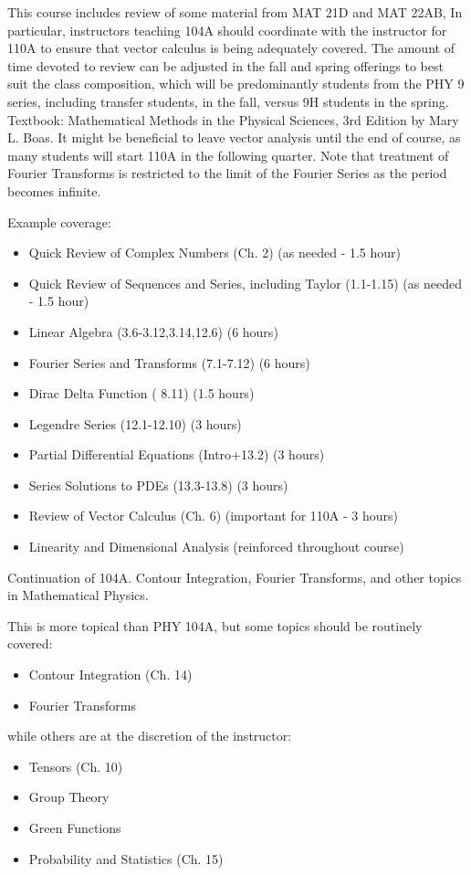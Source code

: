 \documentclass[12pt]{article}
\begin{document}
This course includes review of some material from MAT 21D and MAT
22AB, In particular, instructors teaching 104A should coordinate with
the instructor for 110A to ensure that vector calculus is being
adequately covered.  The amount of time devoted to review can be
adjusted in the fall and spring offerings to best suit the class
composition, which will be predominantly students from the PHY 9
series, including transfer students, in the fall, versus 9H students
in the spring.  Textbook: Mathematical Methods in the Physical
Sciences, 3rd Edition by Mary L. Boas.  It might be beneficial to
leave vector analysis until the end of course, as many students will
start 110A in the following quarter.  Note that treatment of Fourier
Transforms is restricted to the limit of the Fourier Series as the
period becomes infinite.

\begin{samepage}
Example coverage:
\begin{itemize}
\item Quick Review of Complex Numbers (Ch. 2) (as needed - 1.5 hour)
\item Quick Review of Sequences and Series, including Taylor (1.1-1.15) (as needed - 1.5 hour)
\item Linear Algebra (3.6-3.12,3.14,12.6) (6 hours)
\item Fourier Series and Transforms (7.1-7.12) (6 hours)
\item Dirac Delta Function ( 8.11) (1.5 hours)
\item Legendre Series (12.1-12.10) (3 hours)
\item Partial Differential Equations (Intro+13.2) (3 hours)
\item Series Solutions to PDEs (13.3-13.8) (3 hours)
\item Review of Vector Calculus (Ch. 6) (important for 110A - 3 hours)
\item Linearity and Dimensional Analysis (reinforced throughout course)
\end{itemize}
\end{samepage}

\vskip 1cm
Continuation of 104A.  Contour Integration, Fourier Transforms, and other topics in Mathematical Physics.

This is more topical than PHY 104A, but some topics should be routinely covered:
\begin{itemize}
 \item Contour Integration (Ch. 14)
 \item Fourier Transforms
\end{itemize}
while others are at the discretion of the instructor:
\begin{itemize}
 \item Tensors (Ch. 10)
 \item Group Theory
 \item Green Functions
 \item Probability and Statistics (Ch. 15)
\end{itemize}
\end{document}
